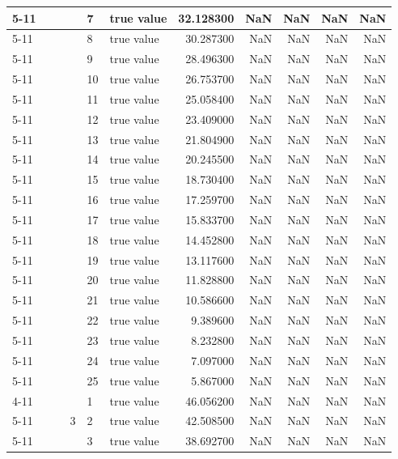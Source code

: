 \begin{tabular}{llllllrrrrr}
\cline{5-11}
 &  &  &  & 7 & true value & 32.128300 & NaN & NaN & NaN & NaN \\
\cline{5-11}
 &  &  &  & 8 & true value & 30.287300 & NaN & NaN & NaN & NaN \\
\cline{5-11}
 &  &  &  & 9 & true value & 28.496300 & NaN & NaN & NaN & NaN \\
\cline{5-11}
 &  &  &  & 10 & true value & 26.753700 & NaN & NaN & NaN & NaN \\
\cline{5-11}
 &  &  &  & 11 & true value & 25.058400 & NaN & NaN & NaN & NaN \\
\cline{5-11}
 &  &  &  & 12 & true value & 23.409000 & NaN & NaN & NaN & NaN \\
\cline{5-11}
 &  &  &  & 13 & true value & 21.804900 & NaN & NaN & NaN & NaN \\
\cline{5-11}
 &  &  &  & 14 & true value & 20.245500 & NaN & NaN & NaN & NaN \\
\cline{5-11}
 &  &  &  & 15 & true value & 18.730400 & NaN & NaN & NaN & NaN \\
\cline{5-11}
 &  &  &  & 16 & true value & 17.259700 & NaN & NaN & NaN & NaN \\
\cline{5-11}
 &  &  &  & 17 & true value & 15.833700 & NaN & NaN & NaN & NaN \\
\cline{5-11}
 &  &  &  & 18 & true value & 14.452800 & NaN & NaN & NaN & NaN \\
\cline{5-11}
 &  &  &  & 19 & true value & 13.117600 & NaN & NaN & NaN & NaN \\
\cline{5-11}
 &  &  &  & 20 & true value & 11.828800 & NaN & NaN & NaN & NaN \\
\cline{5-11}
 &  &  &  & 21 & true value & 10.586600 & NaN & NaN & NaN & NaN \\
\cline{5-11}
 &  &  &  & 22 & true value & 9.389600 & NaN & NaN & NaN & NaN \\
\cline{5-11}
 &  &  &  & 23 & true value & 8.232800 & NaN & NaN & NaN & NaN \\
\cline{5-11}
 &  &  &  & 24 & true value & 7.097000 & NaN & NaN & NaN & NaN \\
\cline{5-11}
 &  &  &  & 25 & true value & 5.867000 & NaN & NaN & NaN & NaN \\
\cline{4-11} \cline{5-11}
 &  &  & \multirow[t]{25}{*}{3} & 1 & true value & 46.056200 & NaN & NaN & NaN & NaN \\
\cline{5-11}
 &  &  &  & 2 & true value & 42.508500 & NaN & NaN & NaN & NaN \\
\cline{5-11}
 &  &  &  & 3 & true value & 38.692700 & NaN & NaN & NaN & NaN \\

\end{tabular}
